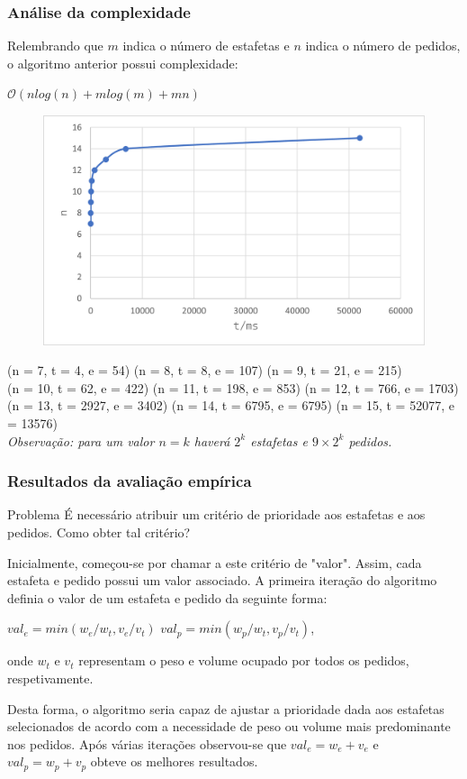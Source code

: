 \documentclass{beamer}
\begin{document}
\begin{frame}
\frametitle{Análise da complexidade}
Relembrando que $m$ indica o número de estafetas e $n$ indica o número de pedidos, o algoritmo anterior
possui complexidade:\\ 
\centerline{$\mathcal{O}(nlog(n) + mlog(m) + mn)$}

\begin{figure}
\includegraphics[width=0.5\linewidth]{assets/scenario1.png}
\end{figure}
{\scriptsize (n = 7, t = 4, e = 54) \hspace{0.1cm} (n = 8, t = 8, e = 107) \hspace{0.1cm} (n = 9, t = 21, e = 215)}\\
{\scriptsize (n = 10, t = 62, e = 422) \hspace{0.1cm} (n = 11, t = 198, e = 853) \hspace{0.1cm} (n = 12, t = 766, e = 1703)}\\
{\scriptsize (n = 13, t = 2927, e = 3402) \hspace{0.1cm} (n = 14, t = 6795, e = 6795) \hspace{0.1cm} (n = 15, t = 52077, e = 13576)}\\

{\footnotesize \textit{Observação: para um valor $n = k$ haverá $2^{k}$ estafetas e $ 9 \times 2^{k}$ pedidos.}}

\end{frame}

\begin{frame}
\frametitle{Resultados da avaliação empírica}
\begin{alertblock}{Problema}
É necessário atribuir um critério de prioridade aos estafetas e aos pedidos. Como obter tal critério?
\end{alertblock}

Inicialmente, começou-se por chamar a este critério de "valor". Assim, cada estafeta e pedido 
possui um valor associado.
A primeira iteração do algoritmo definia o valor de um estafeta e pedido da seguinte forma:\\
\centerline{$val_{e} = min(w_{e}/w_{t}, v_{e}/v_{t})$   \hspace{2cm}   $val_{p} = min(w_{p}/w_{t}, v_{p}/v_{t})$,}

onde $w_{t}$ e $v_{t}$ representam o peso e volume ocupado por todos os pedidos, respetivamente.

Desta forma, o algoritmo seria capaz de ajustar a prioridade dada aos estafetas selecionados de acordo com a necessidade de peso ou volume mais predominante nos pedidos.
Após várias iterações observou-se que $val_{e} = w_{e} + v_{e}$ e $val_{p} = w_{p} + v_{p}$ obteve os melhores resultados.
\end{frame}
\end{document}
